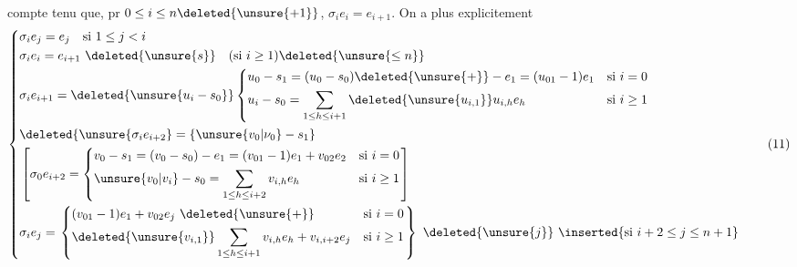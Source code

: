 compte tenu que, pr $0\leq i\leq n\deleted{\unsure{+1}}$, $\sigma_i e_i=e_{i+1}$. On a plus explicitement
\[
\left\{\begin{aligned}
&\sigma_i e_j=e_j\quad\text{si }1\leq j<i\\
&\sigma_i e_i=e_{i+1}\ \deleted{\unsure{s}}\quad(\text{si }i\geq1)\deleted{\unsure{\leq n}}\\
&\sigma_i e_{i+1}=\deleted{\unsure{u_i-s_0}}\left\{\begin{aligned}
&u_0-s_1=(u_0-s_0)\deleted{\unsure{+}}-e_1=(u_{01}-1)e_1&&\text{si }i=0\\
&u_i-s_0=\sum_{1\leq h\leq i+1}\deleted{\unsure{u_{i,1}}}u_{i,h}e_h&&\text{si }i\geq1
\end{aligned}\right.\\
&\deleted{\unsure{\sigma_i e_{i+2}}=\{\unsure{v_0|\nu_0}-s_1}\\
&\left[\sigma_0 e_{i+2}=\left\{\begin{aligned}
&v_0-s_1=(v_0-s_0)-e_1=(v_{01}-1)e_1+v_{02}e_2&&\text{si }i=0\\
&\unsure{v_0|v_i}-s_0=\sum_{1\leq h\leq i+2}v_{i,h}e_h&&\text{si }i\geq1
\end{aligned}\right.\right]\\
&\sigma_i e_j=\left.\left\{\begin{aligned}
&(v_{01}-1)e_1+v_{02}e_j\ \deleted{\unsure{+}}&&\text{si }i=0\\
&\deleted{\unsure{v_{i,1}}}\sum_{1\leq h\leq i+1}v_{i,h}e_h+v_{i,i+2}e_j&&\text{si }i\geq1
\end{aligned}\right.\right\}\ \deleted{\unsure{j}}\ \inserted{\text{si }i+2\leq j\leq n+1}
\end{aligned}\right.\tag*{(11)}
\]

